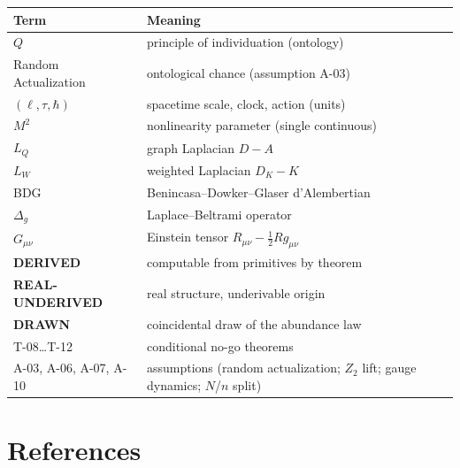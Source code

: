 \documentclass[11pt,twoside]{book}
\newcommand{\derived}{\textbf{DERIVED}}
\newcommand{\realunder}{\textbf{REAL-UNDERIVED}}
\newcommand{\drawn}{\textbf{DRAWN}}
\begin{document}
\begin{center}
\begin{tabular}{lp{10cm}}
\toprule
Term & Meaning \\
\midrule
$Q$ & principle of individuation (ontology) \\
Random Actualization & ontological chance (assumption A-03) \\
$(\ell,\tau,\hbar)$ & spacetime scale, clock, action (units) \\
$M^2$ & nonlinearity parameter (single continuous) \\
$L_Q$ & graph Laplacian $D-A$ \\
$L_W$ & weighted Laplacian $D_K-K$ \\
BDG & Benincasa--Dowker--Glaser d'Alembertian \\
$\Delta_g$ & Laplace--Beltrami operator \\
$G_{\mu\nu}$ & Einstein tensor $R_{\mu\nu}-\tfrac12 R g_{\mu\nu}$ \\
\derived & computable from primitives by theorem \\
\realunder & real structure, underivable origin \\
\drawn & coincidental draw of the abundance law \\
T-08\dots T-12 & conditional no-go theorems \\
A-03, A-06, A-07, A-10 & assumptions (random actualization; $Z_2$ lift; gauge dynamics; $N$/$n$ split) \\
\bottomrule
\end{tabular}
\end{center}


\chapter{References}
\label{app:references}
\end{document}
